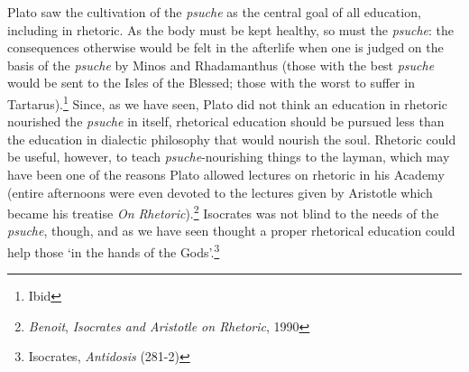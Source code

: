 \begin{multicols}{2}
Plato saw the cultivation of the \emph{psuche} as the central goal of
all education, including in rhetoric. As the body must be kept healthy,
so must the \emph{psuche}: the consequences otherwise would be felt in
the afterlife when one is judged on the basis of the \emph{psuche} by
Minos and Rhadamanthus (those with the best \emph{psuche} would be sent
to the Isles of the Blessed; those with the worst to suffer in
Tartarus).\footnote{\textsuperscript{} Ibid } Since, as we have seen,
Plato did not think an education in rhetoric nourished the \emph{psuche}
in itself, rhetorical education should be pursued less than the
education in dialectic philosophy that would nourish the soul. Rhetoric
could be useful, however, to teach \emph{psuche}-nourishing things to
the layman, which may have been one of the reasons Plato allowed
lectures on rhetoric in his Academy (entire afternoons were even devoted
to the lectures given by Aristotle which became his treatise \emph{On
	Rhetoric}).\footnote{\textsuperscript{} \emph{Benoit}, \emph{Isocrates
		and Aristotle on Rhetoric}, 1990} Isocrates was not blind to the needs
of the \emph{psuche}, though, and as we have seen thought a proper
rhetorical education could help those `in the hands of the
Gods'.\footnote{\textsuperscript{}Isocrates, \emph{Antidosis} (281-2)}


\end{multicols}
